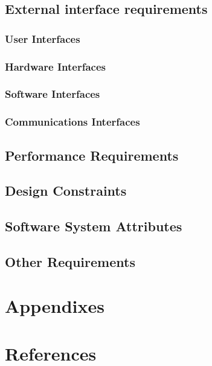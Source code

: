 \documentclass{scrreprt}
\begin{document}
\section{External interface requirements}


\subsection{User Interfaces}

\subsection{Hardware Interfaces}


\subsection{Software Interfaces}


\subsection{Communications Interfaces}




\section{Performance Requirements}

\section{Design Constraints}


\section{Software System Attributes}


\section{Other Requirements}


\chapter{Appendixes}


\chapter{References}


\newpage
\printindex
\end{document}
